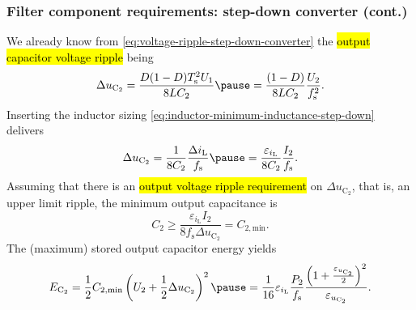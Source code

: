 
\begin{frame}
	\frametitle{Filter component requirements: step-down converter (cont.)}
	We already know from \eqref{eq:voltage-ripple-step-down-converter} the \hl{output capacitor voltage ripple} being
	\begin{equation*}
		\Delta u_\mathrm{C_2} = \frac{D(1-D)T_\mathrm{s}^2U_1}{8LC_2} \pause = \frac{(1-D)}{8LC_2}\frac{U_2}{f_\mathrm{s}^2}.
	\end{equation*}  \pause
	Inserting the inductor sizing \eqref{eq:inductor-minimum-inductance-step-down} delivers
	\begin{equation}
		\Delta u_\mathrm{C_2} = \frac{1}{8C_2} \frac{\Delta i_\mathrm{L}}{f_\mathrm{s}}\pause = \frac{\varepsilon_{i_\mathrm{L}}}{8C_2} \frac{I_2}{f_\mathrm{s}}.
	\end{equation}\pause
	Assuming that there is an \hl{output voltage ripple requirement} on $\Delta u_\mathrm{C_2}$, that is, an upper limit ripple, the minimum output capacitance is
	\begin{equation}
		C_2 \geq \frac{\varepsilon_{i_\mathrm{L}}I_2}{8f_\mathrm{s}\Delta u_\mathrm{C_2}} = C_{2,\mathrm{min}}.
	\end{equation}\pause
	The (maximum) stored output capacitor energy yields
	\begin{equation}
		E_\mathrm{C_2} = \frac{1}{2} C_{2,\mathrm{min}} \left(U_2 + \frac{1}{2}\Delta u_\mathrm{C_2}\right)^2 \pause = \frac{1}{16} \varepsilon_{i_\mathrm{L}}\frac{P_2}{f_\mathrm{s}}\frac{\left(1+\frac{\varepsilon_{u_\mathrm{C_2}}}{2}\right)^2}{\varepsilon_{u_\mathrm{C_2}}}.
	\end{equation}
\end{frame}


